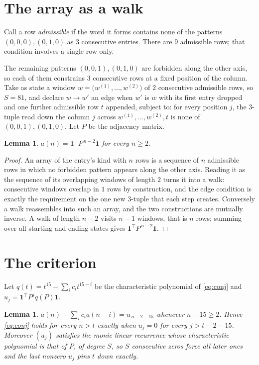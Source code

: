\documentclass[11pt,a4paper]{article}
\theoremstyle{plain}
\newtheorem{lemma}[theorem]{Lemma}
\theoremstyle{definition}
\begin{document}
\section{The array as a walk}

Call a row \emph{admissible} if the word it forms contains none of the patterns
$(0,0,0), (0,1,0)$ as $3$ consecutive entries. There are $9$ admissible rows; that condition
involves a single row only.

The remaining patterns $(0,0,1), (0,1,0)$ are forbidden along the other axis, so each of them
constrains $3$ consecutive rows at a fixed position of the column. Take as state a
window $w=\bigl(w^{(1)},\dots,w^{(2)}\bigr)$ of $2$ consecutive admissible
rows, so $S=81$, and declare $w\to w'$ an edge when $w'$ is $w$ with its first entry
dropped and one further admissible row $t$ appended, subject to: for every position
$j$, the $3$-tuple read down the column $j$ across $w^{(1)},\dots,w^{(2)},t$
is none of $(0,0,1), (0,1,0)$. Let $P$ be the adjacency matrix.

\begin{lemma}\label{lem:walk}
$a(n)=\mathbf{1}^{\!\top}P^{\,n-2}\mathbf{1}$ for every $n\ge2$.
\end{lemma}

\begin{proof}
An array of the entry's kind with $n$ rows is a sequence of $n$ admissible rows in
which no forbidden pattern appears along the other axis. Reading it as the sequence of its
overlapping windows of length $2$ turns it into a walk: consecutive windows overlap in
$1$ rows by construction, and the edge condition is exactly the requirement on the one
new $3$-tuple that each step creates. Conversely a walk reassembles into such an array,
and the two constructions are mutually inverse. A walk of length $n-2$ visits $n-1$
windows, that is $n$ rows; summing over all starting and ending states gives
$\mathbf{1}^{\!\top}P^{\,n-2}\mathbf{1}$.
\end{proof}

\section{The criterion}

Let $q(t)=t^{15}-\sum_i c_i t^{15-i}$ be the characteristic polynomial of
\eqref{eq:conj} and $u_j=\mathbf{1}^{\!\top}P^{j}q(P)\mathbf{1}$.

\begin{lemma}\label{lem:crit}
$a(n)-\sum_i c_i a(n-i)=u_{\,n-2-15}$ whenever $n-15\ge2$. Hence
\eqref{eq:conj} holds for every $n>t$ exactly when $u_j=0$ for every
$j>t-2-15$. Moreover $(u_j)$ satisfies the monic linear recurrence whose
characteristic polynomial is that of $P$, of degree $S$, so $S$ consecutive zeros force all
later ones and the last nonzero $u_j$ pins $t$ down exactly.
\end{lemma}
\end{document}
